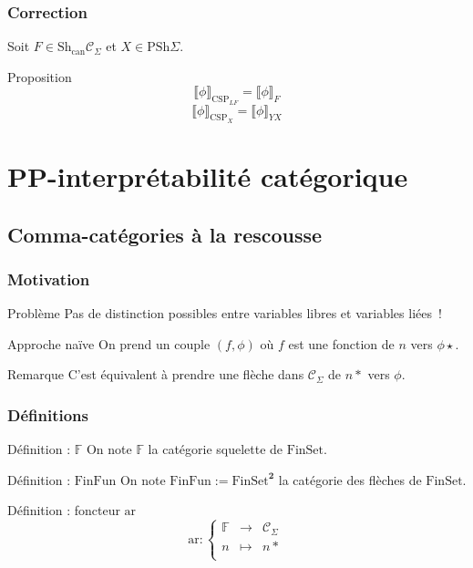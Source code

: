\documentclass[12pt]{beamer}
\newcommand\arf{\text{ar}}
\newcommand\csp{\text{CSP}}
\renewcommand\C{\mathscr{C}}
\newcommand\fset{\text{FinSet}}
\newcommand\ffun{\text{FinFun}}
\newcommand\sem[1]{\llbracket {#1} \rrbracket}
\newcommand\psh{\text{PSh}}
\newcommand\shc{\text{Sh}_\text{can}}
\newcommand{\cf}{\mathbb{F}}
\begin{document}
\begin{frame}
    \frametitle{Correction}

    Soit $F\in\shc{\C_\Sigma}$ et $X\in\psh{\Sigma}$.

    \begin{exampleblock}{Proposition}
        \[\sem{\phi}_{\csp_{LF}} = \sem{\phi}_F\]
        \pause
        \[\sem{\phi}_{\csp_X} = \sem{\phi}_{YX}\]
    \end{exampleblock}
\end{frame}

\section[pp-interprétabilité]{PP-interprétabilité catégorique}

\subsection{Comma-catégories à la rescousse}

\begin{frame}
    \frametitle{Motivation}

    \begin{alertblock}{Problème}
        Pas de distinction possibles entre variables libres et variables liées~!
    \end{alertblock}
    \pause
    \begin{block}{Approche naïve}
        On prend un couple $(f,\phi)$ où $f$ est une fonction de $n$ vers $\phi\star$.
    \end{block}
    \pause
    \begin{exampleblock}{Remarque}
        C'est équivalent à prendre une flèche dans $\C_\Sigma$ de $n\ast$ vers $\phi$.
    \end{exampleblock}
\end{frame}

\begin{frame}
    \frametitle{Définitions}

    \begin{block}{Définition : $\cf$}
        On note $\cf$ la catégorie squelette de $\fset$.
    \end{block}
    \pause
    \begin{block}{Définition : $\ffun$}
        On note $\ffun := \fset^\mathbf{2}$ la catégorie des flèches de $\fset$.
    \end{block}
    \pause
    \begin{block}{Définition : foncteur $\arf$}
        \[\arf : \left\{\begin{array}{ccc}
            \cf & \rightarrow & \C_\Sigma \\
            n   & \mapsto     & n\ast \\
        \end{array}\right.\]
    \end{block}
\end{frame}
\end{document}
